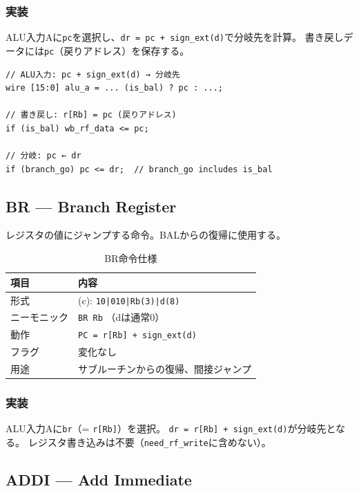 \documentclass[a4paper,11pt]{ltjsarticle}
\begin{document}
\subsubsection{実装}

ALU入力Aに\texttt{pc}を選択し、\texttt{dr = pc + sign\_ext(d)}で分岐先を計算。
書き戻しデータには\texttt{pc}（戻りアドレス）を保存する。

\begin{lstlisting}[caption={BAL命令のデータパス選択}]
// ALU入力: pc + sign_ext(d) → 分岐先
wire [15:0] alu_a = ... (is_bal) ? pc : ...;

// 書き戻し: r[Rb] = pc (戻りアドレス)
if (is_bal) wb_rf_data <= pc;

// 分岐: pc ← dr
if (branch_go) pc <= dr;  // branch_go includes is_bal
\end{lstlisting}

\subsection{BR — Branch Register}

レジスタの値にジャンプする命令。BALからの復帰に使用する。

\begin{table}[h]
\centering
\caption{BR命令仕様}
\begin{tabular}{ll}
\toprule
項目 & 内容 \\
\midrule
形式       & (c): \texttt{10|010|Rb(3)|d(8)} \\
ニーモニック & \texttt{BR Rb} （dは通常0） \\
動作       & \texttt{PC = r[Rb] + sign\_ext(d)} \\
フラグ     & 変化なし \\
用途       & サブルーチンからの復帰、間接ジャンプ \\
\bottomrule
\end{tabular}
\end{table}

\subsubsection{実装}

ALU入力Aに\texttt{br}（= \texttt{r[Rb]}）を選択。
\texttt{dr = r[Rb] + sign\_ext(d)}が分岐先となる。
レジスタ書き込みは不要（\texttt{need\_rf\_write}に含めない）。

\subsection{ADDI — Add Immediate}
\end{document}
